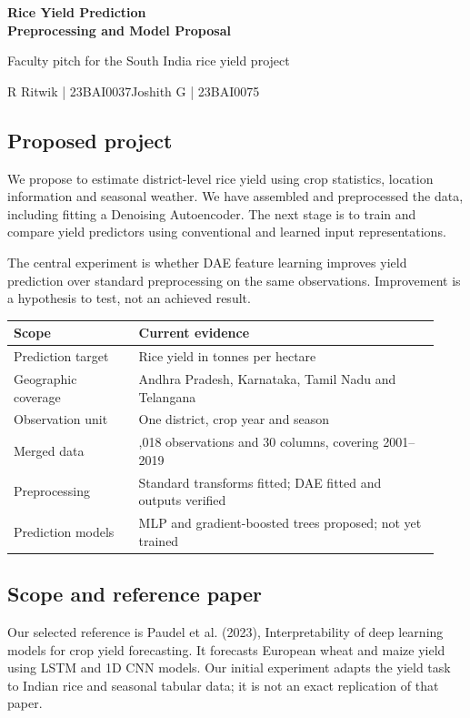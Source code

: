 \documentclass[11pt,a4paper]{article}
\begin{document}
\begin{center}{\LARGE\bfseries Rice Yield Prediction\\[3pt] Preprocessing and Model Proposal}\end{center}
\begin{center}Faculty pitch for the South India rice yield project\end{center}
R Ritwik  |  23BAI0037\newline Joshith G  |  23BAI0075

\subsection*{Proposed project}
We propose to estimate district-level rice yield using crop statistics, location information and seasonal weather. We have assembled and preprocessed the data, including fitting a Denoising Autoencoder. The next stage is to train and compare yield predictors using conventional and learned input representations.

The central experiment is whether DAE feature learning improves yield prediction over standard preprocessing on the same observations. Improvement is a hypothesis to test, not an achieved result.

{\small\renewcommand{\arraystretch}{1.22}\setlength{\tabcolsep}{4pt}\begin{tabular}{>{\raggedright\arraybackslash}p{0.2724\linewidth}>{\raggedright\arraybackslash}p{0.6576\linewidth}}\toprule
\textbf{Scope} & \textbf{Current evidence}\\\midrule
Prediction target & Rice yield in tonnes per hectare\\[3pt]
Geographic coverage & Andhra Pradesh, Karnataka, Tamil Nadu and Telangana\\[3pt]
Observation unit & One district, crop year and season\\[3pt]
Merged data & 2,018 observations and 30 columns, covering 2001--2019\\[3pt]
Preprocessing & Standard transforms fitted; DAE fitted and outputs verified\\[3pt]
Prediction models & MLP and gradient-boosted trees proposed; not yet trained\\[3pt]
\bottomrule\end{tabular}}\par
\subsection*{Scope and reference paper}
Our selected reference is Paudel et al. (2023), Interpretability of deep learning models for crop yield forecasting. It forecasts European wheat and maize yield using LSTM and 1D CNN models. Our initial experiment adapts the yield task to Indian rice and seasonal tabular data; it is not an exact replication of that paper.
\end{document}
